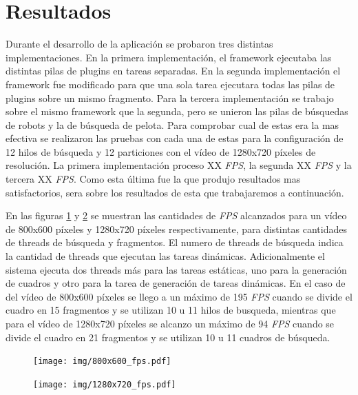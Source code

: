 \section{Resultados}

Durante el desarrollo de la aplicación se probaron tres distintas
implementaciones. En la primera implementación, el framework ejecutaba las
distintas pilas de plugins en tareas separadas. En la segunda implementación el
framework fue modificado para que una sola tarea ejecutara todas las pilas de
plugins sobre un mismo fragmento. Para la tercera implementación se trabajo
sobre el mismo framework que la segunda, pero se unieron las pilas de búsquedas
de robots y la de búsqueda de pelota. Para comprobar cual de estas era la mas
efectiva se realizaron las pruebas con cada una de estas para la configuración
de 12 hilos de búsqueda y 12 particiones con el vídeo de 1280x720 píxeles de
resolución. La primera implementación proceso XX \emph{FPS}, la segunda XX
\emph{FPS} y la tercera XX \emph{FPS}. Como esta última fue la que produjo
resultados mas satisfactorios, sera sobre los resultados de esta que
trabajaremos a continuación.

En las figuras \ref{800fps} y \ref{1280fps} se muestran las cantidades de
\emph{FPS} alcanzados para un vídeo de 800x600 píxeles y 1280x720 píxeles
respectivamente, para distintas cantidades de threads de búsqueda y fragmentos.
El numero de threads de búsqueda indica la cantidad de threads que ejecutan las
tareas dinámicas. Adicionalmente el sistema ejecuta dos threads más para las
tareas estáticas, uno para la generación de cuadros y otro para la tarea de
generación de tareas dinámicas. En el caso de del vídeo de 800x600 píxeles se
llego a un máximo de 195 \emph{FPS} cuando se divide el cuadro en 15 fragmentos
y se utilizan 10 u 11 hilos de busqueda, mientras que para el vídeo de 1280x720
píxeles se alcanzo un máximo de 94 \emph{FPS} cuando se divide el cuadro en 21
fragmentos y se utilizan 10 u 11 cuadros de búsqueda.

\begin{figure}[!h]

	\texttt{[image: img/800x600\_fps.pdf]}
	\caption{}
	\label{800fps}

\end{figure}

\begin{figure}[!h]

	\texttt{[image: img/1280x720\_fps.pdf]}
	\caption{}
	\label{1280fps}

\end{figure}

